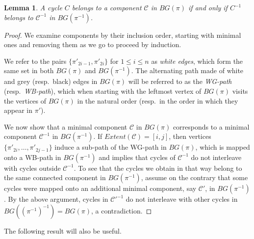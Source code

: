 \documentclass[review]{elsarticle}
\newtheorem{lemma}{Lemma}
\newcommand{\resp}{resp.\ }
\begin{document}
\begin{lemma}\label{lemma:josef-lemma-one}
A cycle $C$ belongs to a component $\mathscr C$ in $BG(\pi)$ if and only if $C^{-1}$ belongs to $\mathscr C^{-1}$ in $BG(\pi^{-1})$.
\end{lemma}
\begin{proof}
We examine components by their inclusion order, starting with minimal ones and removing them as we go to proceed by induction. 

We refer to the pairs $\{\pi'_{2i-1},\pi'_{2i}\}$ for $1 \leq i \leq n$ as \emph{white edges}, which form the same set in both $BG(\pi)$ and $BG(\pi^{-1})$. The alternating path made of white and grey (\resp black) edges in $BG(\pi)$ will be referred to as the \emph{WG-path} (\resp \emph{WB-path}), which when starting with the leftmost vertex of $BG(\pi)$ visits the vertices of $BG(\pi)$ in the natural order (\resp in the order in which they appear in $\pi'$).

We now show that a minimal component $\mathscr C$ in $BG(\pi)$ corresponds to a minimal component $\mathscr C^{-1}$ in $BG(\pi^{-1})$. If $Extent(\mathscr C)=[i, j]$, then vertices $\{\pi'_{2i}, \ldots, \pi'_{2j-1}\}$ induce a sub-path of the WG-path in $BG(\pi)$, which is mapped onto a WB-path in $BG(\pi^{-1})$ and implies that cycles of $\mathscr C^{-1}$ do not interleave with cycles outside $\mathscr C^{-1}$. To see that the cycles we obtain in that way belong to the same connected component in $BG(\pi^{-1})$, assume on the contrary that some cycles were mapped onto an additional minimal component, say $\mathscr C'$, in $BG(\pi^{-1})$. By the above argument, cycles in $\mathscr C'^{-1}$ do not interleave with other cycles in $BG((\pi^{-1})^{-1}) = BG(\pi)$, a contradiction.
\end{proof}

The following result will also be useful.
\end{document}
